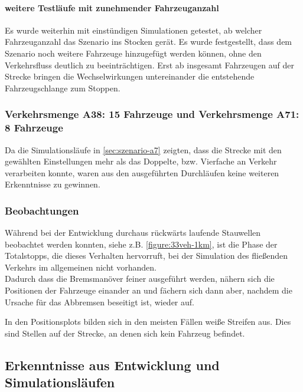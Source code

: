 \paragraph*{weitere Testläufe mit zunehmender Fahrzeuganzahl}

Es wurde weiterhin mit einstündigen Simulationen getestet, ab welcher Fahrzeuganzahl das Szenario ins Stocken gerät.
Es wurde festgestellt, dass dem Szenario noch  weitere Fahrzeuge hinzugefügt werden können, ohne den Verkehrsfluss deutlich zu beeinträchtigen.
Erst ab insgesamt  Fahrzeugen auf der Strecke bringen die Wechselwirkungen untereinander die entstehende Fahrzeugschlange zum Stoppen.




\subsubsection{Verkehrsmenge A38: 15 Fahrzeuge und Verkehrsmenge A71: 8 Fahrzeuge}
\label{sec:szenario-a38-a71}

Da die Simulationsläufe in \cref{sec:szenario-a7} zeigten, dass die Strecke mit den gewählten Einstellungen mehr als das Doppelte, bzw. Vierfache an Verkehr verarbeiten konnte, waren aus den ausgeführten Durchläufen keine weiteren Erkenntnisse zu gewinnen.



\subsubsection{Beobachtungen}

Während bei der Entwicklung durchaus rückwärts laufende Stauwellen beobachtet werden konnten, siehe z.B. \cref{figure:33veh-1km}, ist die Phase der Totalstopps, die dieses Verhalten hervorruft, bei der Simulation des fließenden Verkehrs im allgemeinen nicht vorhanden.
\\
Dadurch dass die Bremsmanöver feiner ausgeführt werden, nähern sich die Positionen der Fahrzeuge einander an und fächern sich dann aber, nachdem die Ursache für das Abbremsen beseitigt ist, wieder auf.

In den Positionsplots bilden sich in den meisten Fällen weiße Streifen aus. Dies sind Stellen auf der Strecke, an denen sich kein Fahrzeug befindet.





\subsection{Erkenntnisse aus Entwicklung und Simulationsläufen}

